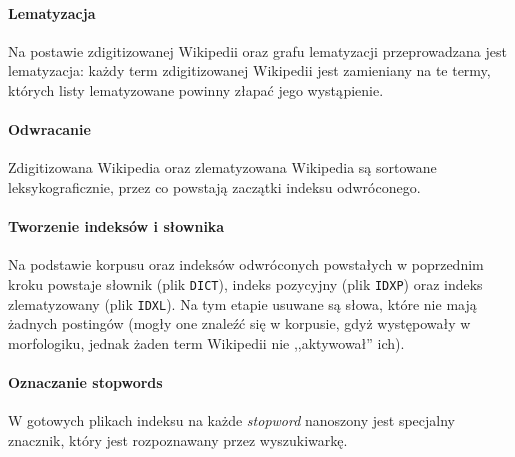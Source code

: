 \documentclass[a4paper,12pt]{article}
\begin{document}
\paragraph{Lematyzacja} Na postawie zdigitizowanej Wikipedii oraz grafu
lematyzacji przeprowadzana jest lematyzacja: każdy term zdigitizowanej
Wikipedii jest zamieniany na te termy, których listy lematyzowane powinny
złapać jego wystąpienie.

\paragraph{Odwracanie} Zdigitizowana Wikipedia oraz zlematyzowana Wikipedia
są sortowane leksykograficznie, przez co powstają zaczątki indeksu odwróconego.

\paragraph{Tworzenie indeksów i słownika} Na podstawie korpusu oraz indeksów
odwróconych powstałych w poprzednim kroku powstaje słownik (plik
\texttt{DICT}), indeks pozycyjny (plik \texttt{IDXP}) oraz indeks zlematyzowany
(plik \texttt{IDXL}). Na tym etapie usuwane są słowa, które nie mają żadnych
postingów (mogły one znaleźć się w korpusie, gdyż występowały w morfologiku,
jednak żaden term Wikipedii nie ,,aktywował'' ich).

\paragraph{Oznaczanie stopwords} W gotowych plikach indeksu na każde
\textit{stopword} nanoszony jest specjalny znacznik, który jest rozpoznawany
przez wyszukiwarkę.
\end{document}
